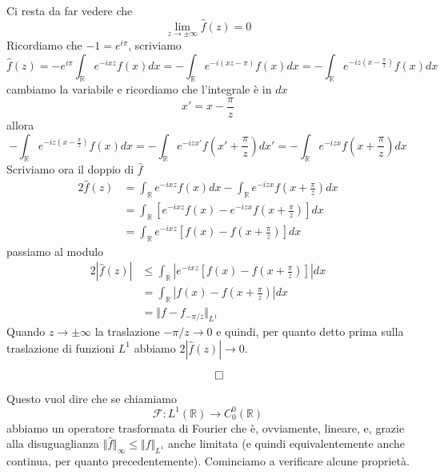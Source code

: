 \documentclass[10pt,a4paper,twoside]{book}
\begin{document}
Ci resta da far vedere che
\begin{equation*}
\lim\limits _{z\rightarrow \pm \infty }\hat{f}( z) =0
\end{equation*}
Ricordiamo che $-1=e^{i\pi }$, scriviamo
\begin{equation*}
\hat{f}( z) =-e^{i\pi }\int _{\mathbb{R}} e^{-ixz} f( x) dx=-\int _{\mathbb{R}} e^{-i( xz-\pi )} f( x) dx=-\int _{\mathbb{R}} e^{-iz\left( x-\frac{\pi }{z}\right)} f( x) dx
\end{equation*}
cambiamo la variabile e ricordiamo che l'integrale è in $dx$
\begin{equation*}
x'=x-\frac{\pi }{z}
\end{equation*}
allora
\begin{equation*}
-\int _{\mathbb{R}} e^{-iz\left( x-\frac{\pi }{z}\right)} f( x) dx=-\int _{\mathbb{R}} e^{-izx'} f\left( x'+\frac{\pi }{z}\right) dx'=-\int _{\mathbb{R}} e^{-izx} f\left( x+\frac{\pi }{z}\right) dx
\end{equation*}
Scriviamo ora il doppio di $\hat{f}$
\begin{align*}
2\hat{f}( z) & =\int _{\mathbb{R}} e^{-ixz} f( x) dx-\int _{\mathbb{R}} e^{-izx} f\left( x+\frac{\pi }{z}\right) dx\\
 & =\int _{\mathbb{R}}\left[ e^{-ixz} f( x) -e^{-izx} f\left( x+\frac{\pi }{z}\right)\right] dx\\
 & =\int _{\mathbb{R}} e^{-ixz}\left[ f( x) -f\left( x+\frac{\pi }{z}\right)\right] dx
\end{align*}
passiamo al modulo
\begin{align*}
2| \hat{f}( z)|  & \leqslant \int _{\mathbb{R}}\left| e^{-ixz}\left[ f( x) -f\left( x+\frac{\pi }{z}\right)\right]\right| dx\\
 & =\int _{\mathbb{R}}\left| f( x) -f\left( x+\frac{\pi }{z}\right)\right| dx\\
 & =\Vert f-f_{-\pi /z}\Vert _{L^{1}}
\end{align*}
Quando $z\rightarrow \pm \infty $ la traslazione $-\pi /z\rightarrow 0$ e quindi, per quanto detto prima sulla traslazione di funzioni $L^{1}$ abbiamo $2| \hat{f}( z)| \rightarrow 0$.

\begin{equation*}
\qed 
\end{equation*}

Questo vuol dire che se chiamiamo
\begin{equation*}
\mathcal{F} :L^{1}(\mathbb{R})\rightarrow C^{0}_{0}(\mathbb{R})
\end{equation*}
abbiamo un operatore trasformata di Fourier che è, ovviamente, lineare, e, grazie alla disuguaglianza $\Vert \hat{f}\Vert _{\infty } \leqslant \Vert f\Vert _{L^{1}}$ anche limitata (e quindi equivalentemente anche continua, per quanto precedentemente). Cominciamo a verificare alcune proprietà.
\end{document}
